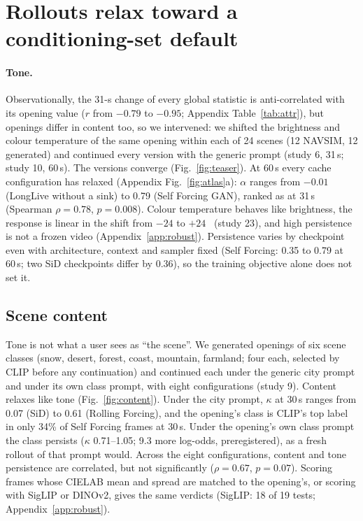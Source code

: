 \section{Rollouts relax toward a conditioning-set default}\label{sec:relax}

\paragraph{Tone.} Observationally, the 31-s change of every global statistic is anti-correlated with its opening value
($r$ from $-0.79$ to $-0.95$; Appendix Table~\ref{tab:attr}), but openings differ in content too, so we intervened: we
shifted the brightness and colour temperature of the same opening within each of 24 scenes (12 NAVSIM, 12 generated)
and continued every version with the generic prompt (study 6, 31\,s; study 10, 60\,s). The versions converge
(Fig.~\ref{fig:teaser}). At 60\,s every cache configuration has relaxed (Appendix Fig.~\ref{fig:atlas}a): $\alpha$ ranges from
$-0.01$ (LongLive without a sink) to 0.79 (Self Forcing GAN), ranked as at 31\,s (Spearman $\rho=0.78$, $p=0.008$).
Colour temperature behaves like brightness, the response is linear in the shift from $-24$ to $+24$~\Lstar{} (study
23), and high persistence is not a frozen video (Appendix~\ref{app:robust}). Persistence varies by checkpoint even with architecture,
context and sampler fixed (Self Forcing: 0.35 to 0.79 at 60\,s; two SiD checkpoints differ by 0.36), so the training
objective alone does not set it.

\subsection{Scene content}\label{sec:content}
Tone is not what a user sees as ``the scene''. We generated openings of six scene classes (snow, desert, forest, coast, mountain, farmland; four each, selected
by CLIP before any continuation) and continued each under the generic city prompt and under its own class prompt, with
eight configurations (study 9). Content relaxes like tone (Fig.~\ref{fig:content}). Under the city prompt, $\kappa$ at
30\,s ranges from 0.07 (SiD) to 0.61 (Rolling Forcing), and the opening's class is CLIP's top label in only 34\% of Self
Forcing frames at 30\,s. Under the opening's own class prompt the class persists ($\kappa$ 0.71--1.05; 9.3
 more log-odds, preregistered), as a fresh rollout of that prompt would. Across the eight
configurations, content and tone persistence are correlated, but not significantly ($\rho=0.67$, $p=0.07$). Scoring frames whose CIELAB mean and spread are matched to the
opening's, or scoring with SigLIP or DINOv2, gives the same verdicts (SigLIP: 18 of 19 tests; Appendix~\ref{app:robust}).

